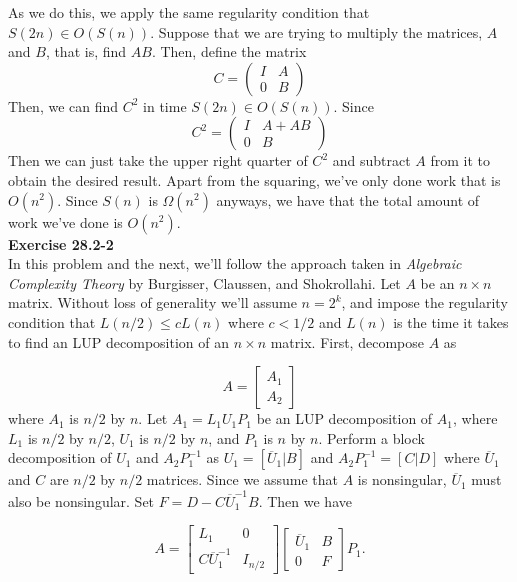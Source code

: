 \documentclass{article}
\begin{document}
As we do this, we apply the same regularity condition that $S(2n)\in O(S(n))$. Suppose that we are trying to multiply the matrices, $A$ and $B$, that is, find $AB$. Then, define the matrix 
\[
C = \left( \begin{array}{cc}I&A\\0&B\end{array}\right)
\]
Then, we can find $C^2$ in time $S(2n) \in O(S(n))$. Since 
\[
C^2 = \left( \begin{array}{cc}I&A+AB\\0&B\end{array}\right)
\]
Then we can just take the upper right quarter of $C^2$ and subtract $A$ from it to obtain the desired result. Apart from the squaring, we've only done work that is $O(n^2)$. Since $S(n)$ is $\Omega(n^2)$ anyways, we have that the total amount of work we've done is $O(n^2)$.\\

\noindent\textbf{Exercise 28.2-2}\\

In this problem and the next, we'll follow the approach taken in \emph{Algebraic Complexity Theory} by Burgisser, Claussen, and Shokrollahi.  Let $A$ be an $n \times n$ matrix.  Without loss of generality we'll assume $n = 2^k$, and impose the regularity condition that $L(n/2) \leq c L(n)$ where $c < 1/2$ and $L(n)$ is the time it takes to find an LUP decomposition of an $n \times n$ matrix.  First, decompose $A$ as 

\[ A = \left[ \begin{array}{c} A_1 \\ A_2 \end{array}\right]\]
where $A_1$ is $n/2$ by $n$.  Let $A_1 = L_1 U_1 P_1$ be an LUP decomposition of $A_1$, where $L_1$ is $n/2$ by $n/2$, $U_1$ is $n/2$ by $n$, and $P_1$ is $n$ by $n$.  Perform a block decomposition of $U_1$ and $A_2P_1^{-1}$ as $U_1 = [\overline{U}_1 | B]$ and $A_2P_1^{-1} = [C|D]$ where $\overline{U}_1$ and $C$ are $n/2$ by $n/2$ matrices. Since we assume that $A$ is nonsingular, $\overline{U}_1$ must also be nonsingular.  Set $F = D-C\overline{U}_1^{-1}B$.  Then we have

\[ A = \left[ \begin{array}{cc} L_1 & 0 \\ C\overline{U}_1^{-1} & I_{n/2} \end{array}\right] \left[\begin{array}{cc} \overline{U}_1 & B \\ 0 & F \end{array} \right] P_1.\]
\end{document}
